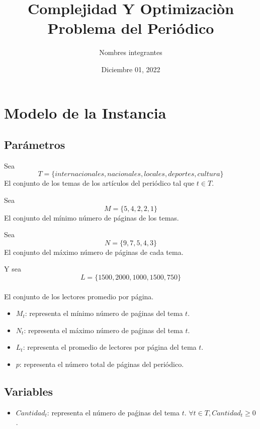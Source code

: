 \documentclass{article}
\title{Complejidad Y Optimizaciòn Problema del Periódico}
\author{Nombres integrantes}
\date{Diciembre 01, 2022}
\begin{document}
\maketitle

\newpage
\tableofcontents
\newpage

\section{Modelo de la Instancia}
\subsection {Parámetros}
Sea 
\newline
$$ T = \{internacionales, nacionales, locales, deportes, cultura\} $$
\newline
El conjunto de los temas de los artículos del periódico tal que  $t \in T$.
\newline

Sea 
$$
M = \{5, 4, 2, 2, 1\}
$$
\newline
El conjunto del mínimo número de páginas de los temas.
\newline

Sea 
$$
N = \{9, 7, 5, 4, 3\}
$$
\newline
El conjunto del máximo número de páginas de cada tema.
\newline

Y sea 
$$
L = \{1500, 2000, 1000, 1500, 750\}
$$
\\
El conjunto de los lectores promedio por página.
\newline
\begin{itemize}
    \item $M_{t}$: representa el mínimo número de paǵinas del tema $t$.
    \item $N_{t}$: representa el máximo número de paǵinas del tema $t$.
    \item $L_{t}$: representa el promedio de lectores por página del tema $t$.
    \item $p$: representa el número total de páginas del periódico.
\end{itemize}

\subsection {Variables}
\begin{itemize}
    \item $Cantidad_{t}$: representa el número de paǵinas del tema $t$. $\forall t \in T, Cantidad_{t} \geq 0$.
\end{itemize}
\end{document}
